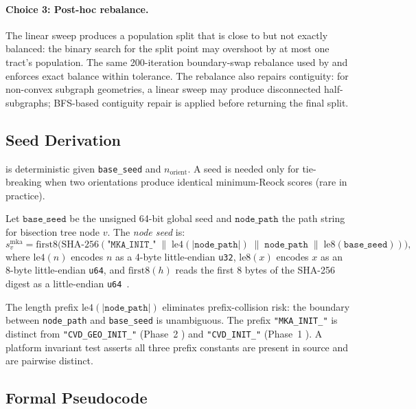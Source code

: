 \paragraph{Choice 3: Post-hoc rebalance.}
The linear sweep produces a population split that is close to but not exactly
balanced: the binary search for the split point may overshoot by at most one
tract's population.
The same 200-iteration boundary-swap rebalance used by \cvdgeo{} and \bfsg{}
enforces exact balance within tolerance.
The rebalance also repairs contiguity: for non-convex subgraph geometries, a
linear sweep may produce disconnected half-subgraphs; BFS-based contiguity
repair is applied before returning the final split.

\subsection{Seed Derivation}
\label{subsec:seed}

\mka{} is deterministic given \texttt{base\_seed} and $n_{\mathrm{orient}}$.
A seed is needed only for tie-breaking when two orientations produce
identical minimum-Reock scores (rare in practice).

\begin{definition}
\label{def:mka-seed}
Let $\mathtt{base\_seed}$ be the unsigned 64-bit global seed and
$\mathtt{node\_path}$ the path string for bisection tree node $v$.
The \emph{\mka{} node seed} is:
\[
  s_v^{\mathrm{mka}} = \mathrm{first8}\bigl(
    \mathrm{SHA\text{-}256}(
      \texttt{"MKA\_INIT\_"}
      \;\|\; \mathrm{le4}(|\mathtt{node\_path}|)
      \;\|\; \mathtt{node\_path}
      \;\|\; \mathrm{le8}(\mathtt{base\_seed})
    )
  \bigr),
\]
where $\mathrm{le4}(n)$ encodes $n$ as a 4-byte little-endian \texttt{u32},
$\mathrm{le8}(x)$ encodes $x$ as an 8-byte little-endian \texttt{u64}, and
$\mathrm{first8}(h)$ reads the first 8 bytes of the SHA-256 digest as a
little-endian \texttt{u64}~\citep{sha256nist}.
\end{definition}

The length prefix $\mathrm{le4}(|\mathtt{node\_path}|)$ eliminates
prefix-collision risk: the boundary between \texttt{node\_path} and
\texttt{base\_seed} is unambiguous.
The prefix \texttt{"MKA\_INIT\_"} is distinct from \texttt{"CVD\_GEO\_INIT\_"}
(Phase~2 \cvdgeo{}) and \texttt{"CVD\_INIT\_"} (Phase~1 \cvd{}).
A platform invariant test asserts all three prefix constants are present in
source and are pairwise distinct.

\subsection{Formal Pseudocode}

